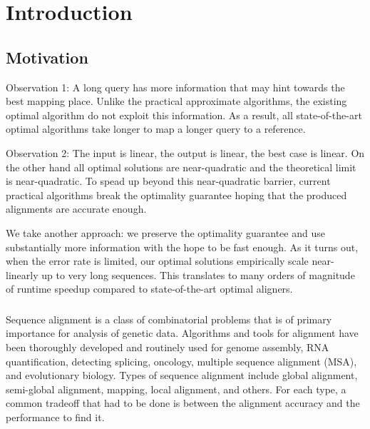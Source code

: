 \graphicspath{{\dir/}}

\chapter{Introduction} \label{ch:introduction}

\section{Motivation}

Observation 1: A long query has more information that may hint towards the best
mapping place. Unlike the practical approximate algorithms, the existing optimal
algorithm do not exploit this information. As a result, all state-of-the-art
optimal algorithms take longer to map a longer query to a reference. 

Observation 2: The input is linear, the output is linear, the best case is
linear. On the other hand all optimal solutions are near-quadratic and the
theoretical limit is near-quadratic. To spead up beyond this near-quadratic
barrier, current practical algorithms break the optimality guarantee hoping that
the produced alignments are accurate enough. 

We take another approach: we preserve the optimality guarantee and use
substantially more information with the hope to be fast enough. As it turns out,
when the error rate is limited, our optimal solutions empirically scale
near-linearly up to very long sequences. This translates to many orders of
magnitude of runtime speedup compared to state-of-the-art optimal aligners.

\subsection{}


Sequence alignment is a class of combinatorial problems that is of primary
importance for analysis of genetic data. Algorithms and tools for alignment have
been thoroughly developed and routinely used for genome assembly, RNA
quantification, detecting splicing, oncology, multiple sequence alignment (MSA),
and evolutionary biology. Types of sequence alignment include global alignment,
semi-global alignment, mapping, local alignment, and others. For each type, a
common tradeoff that had to be done is between the alignment accuracy and the
performance to find it.

